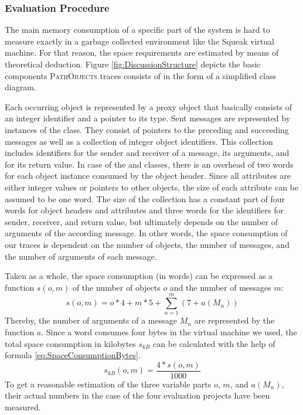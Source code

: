 \subsubsection{Evaluation Procedure}
The main memory consumption of a specific part of the system is hard to measure exactly in a garbage collected environment like the Squeak virtual machine.
For that reason, the space requirements are estimated by means of theoretical deduction.
Figure \ref{fig:DiscussionStructure} depicts the basic components \textsc{PathObjects} traces consists of in the form of a simplified class diagram.

Each occurring object is represented by a proxy object that basically consists of an integer identifier and a pointer to its type.
Sent messages are represented by instances of the  class.
They consist of pointers to the preceding and succeeding messages as well as a collection of integer object identifiers.
This collection includes identifiers for the sender and receiver of a message, its arguments, and for its return value.
In case of the  and  classes, there is an overhead of two words for each object instance consumed by the object header.
Since all attributes are either integer values or pointers to other objects, the size of each attribute can be assumed to be one word.
The size of the  collection has a constant part of four words for object headers and attributes and three words for the identifiers for sender, receiver, and return value, but ultimately depends on the number of arguments of the according message.
In other words, the space consumption of our traces is dependent on the number of objects, the number of messages, and the number of arguments of each message.

Taken as a whole, the space consumption (in words) can be expressed as a function $s(o,m)$ of the number of objects $o$ and the number of messages $m$:
\begin{equation}
s(o,m)=o*4 + m*5 + \sum_{n=1}^{m} (7 + a(M_n))\label{eq:SpaceConsumptionWords}
\end{equation}
Thereby, the number of arguments of a message $M_n$ are represented by the function $a$.
Since a word consumes four bytes in the virtual machine we used, the total space consumption in kilobytes $s_{kB}$ can be calculated with the help of formula \ref{eq:SpaceConsumptionBytes}. 
\begin{equation}
s_{kB}(o,m) = \frac{4 * s(o,m)}{1000}\label{eq:SpaceConsumptionBytes}
\end{equation}
To get a reasonable estimation of the three variable parts $o$, $m$, and $a(M_n)$, their actual numbers in the case of the four evaluation projects have been measured.

